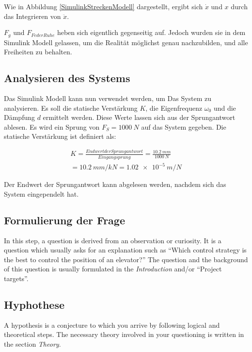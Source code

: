 	Wie in Abbildung \ref{SimulinkStreckenModell} dargestellt, ergibt sich $\dot{x}$ und $x$ durch das Integrieren von $\ddot{x}$.

	

	$F_{g}$ und $F_{FederRuhe}$ heben sich eigentlich gegenseitig auf. Jedoch wurden sie in dem Simulink Modell gelassen,
	um die Realität möglichst genau nachzubilden, und alle Freiheiten zu behalten.

	\subsection{Analysieren des Systems}
	Das Simulink Modell kann nun verwendet werden, um Das System zu analysieren.
	Es soll die statische Verstärkung $K$, die Eigenfrequenz $\omega_{0}$ und die Dämpfung $d$ ermittelt werden.
	Diese Werte lassen sich aus der Sprungantwort ablesen. Es wird ein Sprung von $F_{S} = \SI{1000}{N}$ 
	auf das System gegeben.
	Die statische Verstärkung ist definiert als: 

	
		\begin{multline}
			K =  \frac{Endwert der Sprungantwort}{Eingangsprung} = \frac{\SI{10,2}{mm}}{\SI{1000}{N}} \\
			= \SI{10,2}{mm/kN} = \SI{1,02e-5}{m/N}
			\label{statische Verstaerkung}
		\end{multline}
	

	Der Endwert der Sprungantwort kann abgelesen werden, nachdem sich das System eingependelt hat.




	
	\subsection{Formulierung der Frage}
	
	In this step, a question is derived from an observation or curiosity. It is a question which usually asks for an explanation such as ``Which control strategy is the best to control the position of an elevator?'' The question and the background of this question is usually formulated in the \emph{Introduction} and/or ``Project targets''.
	
	\subsection{Hyphothese}
	
	A hypothesis is a conjecture to which you arrive by following logical and theoretical steps. The necessary theory involved in your questioning is written in the section \emph{Theory}.
	
